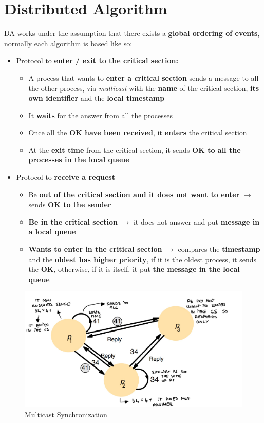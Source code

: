 \section{Distributed Algorithm}
DA works under the assumption that there exists a \textbf{global ordering of events}, normally each algorithm is based like so:
\begin{itemize}
    \item Protocol to \textbf{enter / exit to the critical section:}
        \begin{itemize}
            \item A process that wants to \textbf{enter a critical section} sends a message to all the other process, via \textit{multicast} with the \textbf{name} of the critical section, \textbf{its own identifier} and the \textbf{local timestamp}
            \item It \textbf{waits} for the answer from all the processes
            \item Once all the \textbf{OK have been received}, it \textbf{enters} the critical section
            \item At the \textbf{exit time} from the critical section, it sends \textbf{OK to all the processes in the local queue}
        \end{itemize}
    \item Protocol to \textbf{receive a request}
        \begin{itemize}
            \item Be \textbf{out of the critical section and it does not want to enter} \(\rightarrow\) sends \textbf{OK to the sender}
            \item \textbf{Be in the critical section} \(\rightarrow\) it does not answer and put \textbf{message in a local queue}
            \item \textbf{Wants to enter in the critical section} \(\rightarrow\) compares the \textbf{timestamp} and the \textbf{oldest has higher priority}, if it is the oldest process, it sends the \textbf{OK}, otherwise, if it is itself, it put \textbf{the message in the local queue}
        \end{itemize}
\end{itemize}

\begin{figure}[!h]
    \centering
    \includegraphics[width=.7\linewidth]{images/SynchronizationCoordinationDS/multicastSynch.jpeg}
    \caption{Multicast Synchronization}
\end{figure}

